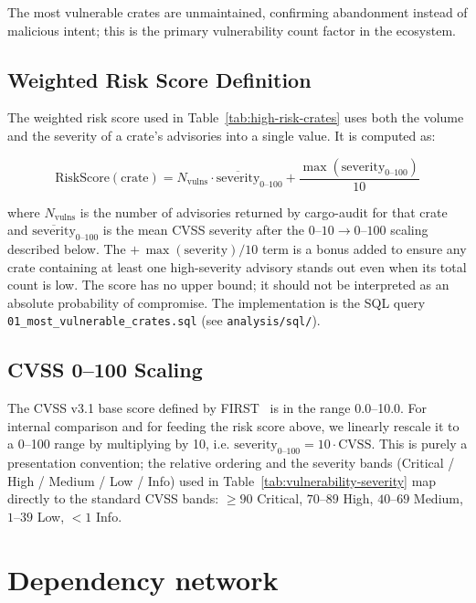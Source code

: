 The most vulnerable crates are unmaintained, confirming abandonment instead of malicious intent; this is the primary vulnerability count factor in the ecosystem.

\subsection{Weighted Risk Score Definition}\label{subsect:risk-score-def}

The weighted risk score used in Table~\ref{tab:high-risk-crates} uses both the volume and the severity of a crate's advisories into a single value.
It is computed as:

\begin{equation}
\label{eq:risk-score}
\text{RiskScore}(\text{crate}) = N_\text{vulns} \cdot \overline{\text{severity}}_{0\text{--}100} + \frac{\max(\text{severity}_{0\text{--}100})}{10}
\end{equation}

where $N_\text{vulns}$ is the number of advisories returned by cargo-audit for that crate and $\overline{\text{severity}}_{0\text{--}100}$ is the mean CVSS severity after the $0\text{--}10 \to 0\text{--}100$ scaling described below. The $+\,\max(\text{severity})/10$ term is a bonus added to ensure any crate containing at least one high-severity advisory stands out even when its total count is low. The score has no upper bound; it should not be interpreted as an absolute probability of compromise. The implementation is the SQL query \texttt{01\_most\_vulnerable\_crates.sql} (see \texttt{analysis/sql/}).

\subsection{CVSS 0--100 Scaling}\label{subsect:cvss-scaling}

The CVSS v3.1 base score defined by FIRST~\cite{cvss2019} is in the range 0.0--10.0. For internal comparison and for feeding the risk score above, we linearly rescale it to a 0--100 range by multiplying by 10, i.e. $\text{severity}_{0\text{--}100} = 10 \cdot \text{CVSS}$. This is purely a presentation convention; the relative ordering and the severity bands (Critical / High / Medium / Low / Info) used in Table~\ref{tab:vulnerability-severity} map directly to the standard CVSS bands: $\geq 90$ Critical, $70$--$89$ High, $40$--$69$ Medium, $1$--$39$ Low, $< 1$ Info.


\section{Dependency network}\label{sect:dependency-network}

